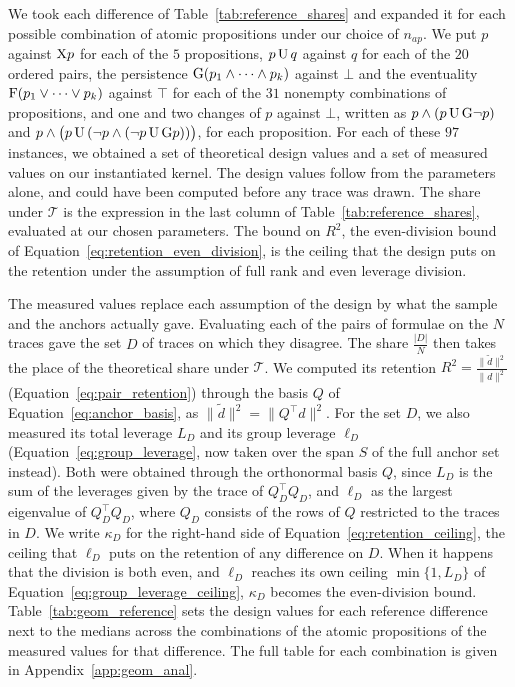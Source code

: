\documentclass[titlepage,a4paper,11pt]{report}
\begin{document}
    We took each difference of Table~\ref{tab:reference_shares} and expanded it for each possible combination of atomic propositions under our choice of $n_{ap}$. We put $p$ against $\text{X} p$ for each of the $5$ propositions, $p\,\text{U}\,q$ against $q$ for each of the $20$ ordered pairs, the persistence $\text{G}(p_1\land\dots\land p_k)$ against $\bot$ and the eventuality $\text{F}(p_1\lor\dots\lor p_k)$ against $\top$ for each of the $31$ nonempty combinations of propositions, and one and two changes of $p$ against $\bot$, written as $p\land(p\,\text{U}\,\text{G}\neg p)$ and $p\land\bigl(p\,\text{U}\,(\neg p\land(\neg p\,\text{U}\,\text{G} p))\bigr)$, for each proposition. For each of these $97$ instances, we obtained a set of theoretical design values and a set of measured values on our instantiated kernel. The design values follow from the parameters alone, and could have been computed before any trace was drawn. The share under $\mathcal T$ is the expression in the last column of Table~\ref{tab:reference_shares}, evaluated at our chosen parameters. The bound on $R^2$, the even-division bound of Equation~\eqref{eq:retention_even_division}, is the ceiling that the design puts on the retention under the assumption of full rank and even leverage division. 

    The measured values replace each assumption of the design by what the sample and the anchors actually gave. Evaluating each of the pairs of formulae on the $N$ traces gave the set $D$ of traces on which they disagree. The share $\frac{|D|}{N}$ then takes the place of the theoretical share under $\mathcal T$. We computed its retention $R^2=\frac{\lVert\tilde d\rVert^2}{\lVert d\rVert^2}$ (Equation~\eqref{eq:pair_retention}) through the basis $Q$ of Equation~\eqref{eq:anchor_basis}, as $\lVert\tilde d\rVert^2=\lVert Q^\top d\rVert^2$. For the set $D$, we also measured its total leverage $L_D$ and its group leverage $\ell_D$ (Equation~\eqref{eq:group_leverage}, now taken over the span $S$ of the full anchor set instead). Both were obtained through the orthonormal basis $Q$, since $L_D$ is the sum of the leverages given by the trace of $Q_D^\top Q_D$, and $\ell_D$ as the largest eigenvalue of $Q_D^\top Q_D$, where $Q_D$ consists of the rows of $Q$ restricted to the traces in $D$. We write $\kappa_D$ for the right-hand side of Equation~\eqref{eq:retention_ceiling}, the ceiling that $\ell_D$ puts on the retention of any difference on $D$. When it happens that the division is both even, and $\ell_D$ reaches its own ceiling $\min\{1,L_D\}$ of Equation~\eqref{eq:group_leverage_ceiling}, $\kappa_D$ becomes the even-division bound. Table~\ref{tab:geom_reference} sets the design values for each reference difference next to the medians across the combinations of the atomic propositions of the measured values for that difference. The full table for each combination is given in Appendix~\ref{app:geom_anal}.
\end{document}
